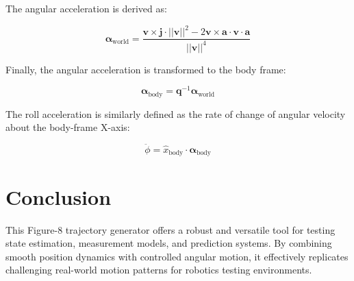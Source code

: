 \documentclass{article}
\begin{document}
	The angular acceleration is derived as:

	\[
	\boldsymbol{\alpha}_{\text{world}} = \frac{\mathbf{v} \times \mathbf{j} \cdot ||\mathbf{v}||^2 - 2\mathbf{v} \times \mathbf{a} \cdot \mathbf{v} \cdot \mathbf{a}}{||\mathbf{v}||^4}
	\]

	Finally, the angular acceleration is transformed to the body frame:

	\[
	\boldsymbol{\alpha}_{\text{body}} = \mathbf{q}^{-1} \boldsymbol{\alpha}_{\text{world}}
	\]

	The roll acceleration is similarly defined as the rate of change of angular velocity about the body-frame X-axis:

	\[
	\ddot{\phi} = \hat{x}_{\text{body}} \cdot \boldsymbol{\alpha}_{\text{body}}
	\]

	\section{Conclusion}
	This Figure-8 trajectory generator offers a robust and versatile tool for testing state estimation, measurement models, and prediction systems. By combining smooth position dynamics with controlled angular motion, it effectively replicates challenging real-world motion patterns for robotics testing environments.
\end{document}
